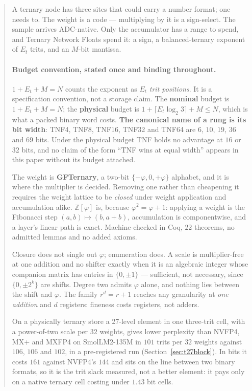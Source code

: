 \documentclass[11pt]{article}
\date{22 September 2026}
\begin{document}
\maketitle

\begin{abstract}
A ternary node has three sites that could carry a number format; one needs to.
The weight is a code --- multiplying by it is a sign-select. The sample arrives
ADC-native. Only the accumulator has a range to spend, and Ternary Network
Floats spend it: a sign, a balanced-ternary exponent of $E_t$ trits, and an
$M$-bit mantissa.

\paragraph{Budget convention, stated once and binding throughout.}\label{sec:budget}
$1+E_t+M=N$ counts the exponent as $E_t$ \emph{trit positions}. It is a
specification convention, not a storage claim. The \textbf{nominal} budget is
$1+E_t+M=N$; the \textbf{physical} budget is $1+\lceil E_t\log_2 3\rceil+M\le N$,
which is what a packed binary word costs. \textbf{The canonical name of a rung
is its bit width}: TNF4, TNF8, TNF16, TNF32 and TNF64 are $6$, $10$, $19$, $36$
and $69$ bits. Under the physical budget TNF holds no advantage at $16$ or $32$
bits, and no claim of the form ``TNF wins at equal width'' appears in this paper
without its budget attached.

The weight is \textbf{GFTernary}, a two-bit $\{-\varphi,0,+\varphi\}$ alphabet,
and it is where the multiplier is decided. Removing one rather than cheapening
it requires the weight lattice to be \emph{closed} under weight application and
accumulation alike. $\mathbb{Z}[\varphi]$ is, because $\varphi^2=\varphi+1$:
applying a weight is the Fibonacci step $(a,b)\mapsto(b,a+b)$, accumulation is
componentwise, and a layer's linear path is exact. Machine-checked in Coq, $22$
theorems, no admitted lemmas and no added axioms.

Closure does not single out $\varphi$; enumeration does. A scale is
multiplier-free at one addition and no shifter exactly when it is an algebraic
integer whose companion matrix has entries in $\{0,\pm1\}$ --- sufficient, not
necessary, since $\{0,\pm 2^k\}$ are shifts. Degree two admits $\varphi$ alone,
and nothing lies between the shift and $\varphi$. The family $r^d=r+1$ reaches
any granularity at \emph{one addition} and $d$ registers: fineness costs
registers, not adders.

On a physically ternary store a 27-level element in one three-trit cell, with a
power-of-two scale per $32$ weights, gives lower perplexity than NVFP4, MX+ and
MXFP4 on SmolLM2-135M in $101$ trits per $32$ weights against $106$, $106$ and
$102$, in a pre-registered run (Section~\ref{sec:t27block}). In bits it costs
$161$ against NVFP4's $144$ and sits on the line between two binary formats, so
it is the trit slack measured, not a better element: it pays only on a native
ternary cell costing under $1.43$ bit cells.


\end{abstract}
\end{document}
